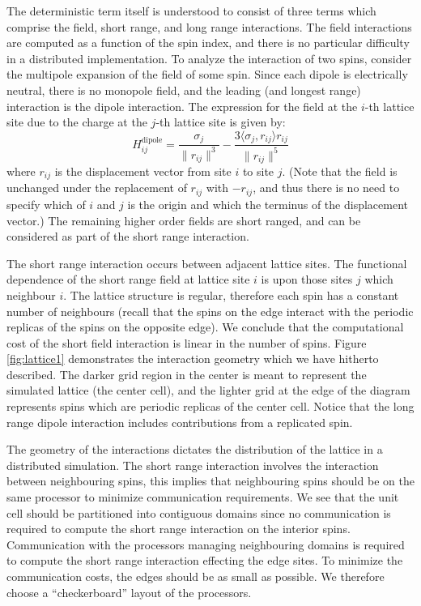 \documentclass{article}
\theoremstyle{definition}
\begin{document}
The deterministic term itself is understood to consist of three terms which
comprise the field, short range, and long range interactions. The field
interactions are computed as a function of the spin index, and there is no
particular difficulty in a distributed implementation. To analyze the
interaction of two spins, consider the multipole expansion of the field of some
spin. Since each dipole is electrically neutral, there is no monopole field, and
the leading (and longest range) interaction is the dipole interaction. The
expression for the field at the $i$-th lattice site due to the charge at the
$j$-th lattice site is given by:
\begin{displaymath}
  H^\text{dipole}_{ij} = \frac{\sigma_j}{\|r_{ij}\|^3} - \frac{3 \langle
\sigma_j , r_{ij} \rangle r_{ij}}{\|r_{ij}\|^5}
\end{displaymath}
where $r_{ij}$ is the displacement vector from site $i$ to site $j$. (Note that
the field is unchanged under the replacement of $r_{ij}$ with $-r_{ij}$, and thus
there is no need to specify which of $i$ and $j$ is the origin and which the
terminus of the displacement vector.) The remaining higher order fields are
short ranged, and can be considered as part of the short range interaction.

The short range interaction occurs between adjacent lattice sites. The
functional dependence of the short range field at lattice site $i$ is upon those
sites $j$ which neighbour $i$. The lattice structure is regular, therefore each
spin has a constant number of neighbours (recall that the spins on the edge
interact with the periodic replicas of the spins on the opposite edge). We
conclude that the computational cost of the short field interaction is linear in
the number of spins. Figure \ref{fig:lattice1} demonstrates the interaction
geometry which we have hitherto described. The darker grid region in the center
is meant to represent the simulated lattice (the center cell), and the lighter
grid at the edge of the diagram represents spins which are periodic replicas of
the center cell. Notice that the long range dipole interaction includes
contributions from a replicated spin.

The geometry of the interactions dictates the distribution of the lattice in a
distributed simulation. The short range interaction involves the interaction
between neighbouring spins, this implies that neighbouring spins should be on
the same processor to minimize communication requirements. We see that the unit
cell should be partitioned into contiguous domains since no communication is
required to compute the short range interaction on the interior spins.
Communication with the processors managing neighbouring domains is required to
compute the short range interaction effecting the edge sites. To minimize the
communication costs, the edges should be as small as possible. We therefore
choose a ``checkerboard'' layout of the processors.
\end{document}

